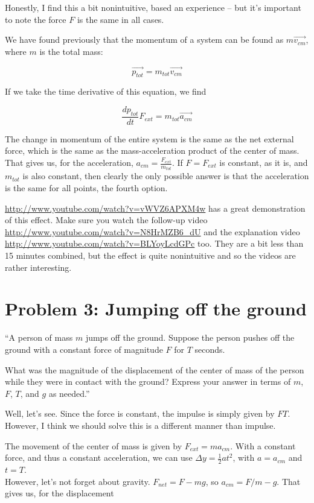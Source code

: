 \documentclass[12pt,a4paper]{report}
\begin{document}
Honestly, I find this a bit nonintuitive, based an experience -- but it's important to note the force $F$ is the same in all cases.

We have found previously that the momentum of a system can be found as $m \vec{v_{cm}}$, where $m$ is the total mass:

\begin{equation}
\vec{p_{tot}} = m_{tot} \vec{v_{cm}}
\end{equation}

If we take the time derivative of this equation, we find

\begin{equation}
\frac{d p_{tot}}{dt} F_{ext} = m_{tot} \vec{a_{cm}}
\end{equation}

The change in momentum of the entire system is the same as the net external force, which is the same as the mass-acceleration product of the center of mass. That gives us, for the acceleration, $\displaystyle a_{cm} = \frac{F_{ext}}{m_{tot}}$. If $F = F_{ext}$ is constant, as it is, and $m_{tot}$ is also constant, then clearly the only possible answer is that the acceleration is the same for all points, the fourth option.

\url{http://www.youtube.com/watch?v=vWVZ6APXM4w} has a great demonstration of this effect. Make sure you watch the follow-up video \url{http://www.youtube.com/watch?v=N8HrMZB6_dU} and the explanation video \url{http://www.youtube.com/watch?v=BLYoyLcdGPc} too. They are a bit less than 15 minutes combined, but the effect is quite nonintuitive and so the videos are rather interesting.

\section{Problem 3: Jumping off the ground}

``A person of mass $m$ jumps off the ground. Suppose the person pushes off the ground with a constant force of magnitude $F$ for $T$ seconds.

What was the magnitude of the displacement of the center of mass of the person while they were in contact with the ground? Express your answer in terms of $m$, $F$, $T$, and $g$ as needed.''

Well, let's see. Since the force is constant, the impulse is simply given by $F T$. However, I think we should solve this is a different manner than impulse.

The movement of the center of mass is given by $F_{ext} = m a_{cm}$. With a constant force, and thus a constant acceleration, we can use $\Delta y = \frac{1}{2} a t^2$, with $a = a_{cm}$ and $t = T$.\\
However, let's not forget about gravity. $F_{net} = F - m g$, so $a_{cm} = F/m - g$. That gives us, for the displacement
\end{document}
